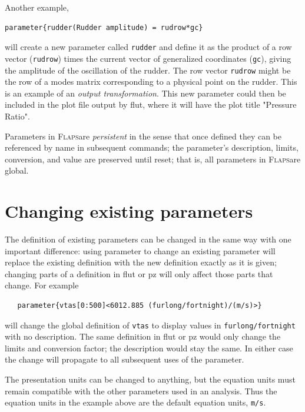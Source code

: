\documentclass[11pt,openany,twoside]{book}
\numberwithin{equation}{section}		%
\newcommand{\Cmd}[1]{{\sf #1}}
\newcommand{\Newterm}[1]{{\em #1}}
\newcommand{\Code}[1]{{\small\tt #1}}
\newcommand{\Flaps}{\textsc{Flaps\:}}
\begin{document}
Another example,
\begin{lstlisting}
parameter{rudder(Rudder amplitude) = rudrow*gc}
\end{lstlisting}
will create a new parameter called \Code{rudder} and
define it as the product of a row vector (\Code{rudrow}) times
the current vector of generalized coordinates (\Code{gc}), giving the
amplitude of the oscillation of the rudder. The row vector \Code{rudrow}
might be the row of a modes matrix corresponding to a physical point
on the rudder. This is an example of an \Newterm{output transformation}.
This new parameter could then be included in the plot file
output by \Cmd{flut}, where it will have the plot title "Pressure Ratio".
\par
Parameters in \Flaps are \Newterm{persistent} in the
sense that once defined they can be referenced by name in subsequent
commands; the parameter's description, limits, conversion,
and value are preserved until reset; that is, all parameters in
\Flaps are global.

\section{Changing existing parameters}\label{sect:changing-par}
The definition of existing parameters can be changed in the
same way with one important difference: using \Cmd{parameter}
to change an existing parameter will replace the existing
definition with the new definition exactly as it is given;
changing parts of a definition in \Cmd{flut} or \Cmd{pz}
will only affect those parts that change. For example
\begin{lstlisting}
   parameter{vtas[0:500]<6012.885 (furlong/fortnight)/(m/s)>}
\end{lstlisting}
will change the global definition of \Code{vtas} to display
values in \Code{furlong/fortnight} with no description.
The same definition in \Cmd{flut} or \Cmd{pz} would only
change the limits and conversion factor; the description
would stay the same.
In either case the change will propagate to all subsequent
uses of the parameter.

The presentation units can be changed to anything, but the
equation units must remain compatible with the other
parameters used in an analysis. Thus the equation units
in the example above are the default equation units, \Code{m/s}.

\end{document}
